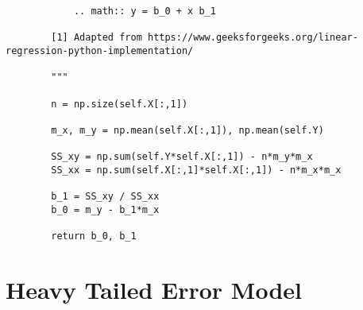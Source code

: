\documentclass[10pt]{article}
\begin{document}
\begin{lstlisting}
            .. math:: y = b_0 + x b_1

        [1] Adapted from https://www.geeksforgeeks.org/linear-regression-python-implementation/ 

        """

        n = np.size(self.X[:,1]) 
      
        m_x, m_y = np.mean(self.X[:,1]), np.mean(self.Y) 
      
        SS_xy = np.sum(self.Y*self.X[:,1]) - n*m_y*m_x 
        SS_xx = np.sum(self.X[:,1]*self.X[:,1]) - n*m_x*m_x 
      
        b_1 = SS_xy / SS_xx 
        b_0 = m_y - b_1*m_x 
      
        return b_0, b_1
    \end{lstlisting}

  \section{Heavy Tailed Error Model}
\end{document}
